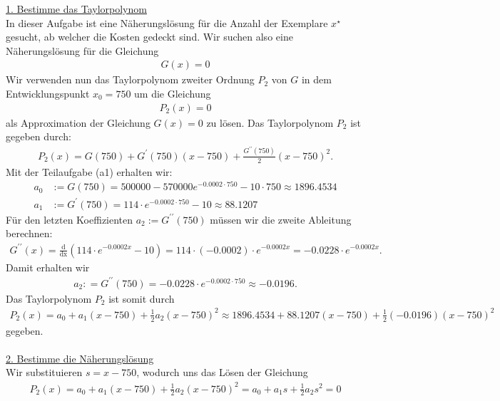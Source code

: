 \underline{1. Bestimme das Taylorpolynom}\\
In dieser Aufgabe ist eine Näherungslösung für die Anzahl der Exemplare $x^\star$ gesucht, ab welcher die Kosten gedeckt sind. Wir suchen also eine Näherungslösung für die Gleichung
\begin{align*}
	G(x) = 0
\end{align*}
Wir verwenden nun das Taylorpolynom zweiter Ordnung $P_2$ von $G$ in dem Entwicklungspunkt $x_0 = 750$ um die Gleichung
\begin{align*}
	P_2(x) = 0
\end{align*}
als Approximation der Gleichung $G(x) = 0$ zu lösen. Das Taylorpolynom $P_2$ ist gegeben durch:
\begin{align*}
	P_2(x)
	=
	G(750) 
	+ G^\prime(750) (x - 750)
	+ \frac{G^{\prime \prime}(750)}{2} (x - 750)^2.
\end{align*}
Mit der Teilaufgabe (a1)  erhalten wir:
\begin{align*}
	a_0 &:= G(750) 
	= 
	500000 - 570000 e^{-0.0002 \cdot 750 } - 10 \cdot 750
	\approx  1896.4534\\
	a_1 &:= G^\prime(750)
	=
	114 \cdot e^{-0.0002 \cdot  750}- 10
	\approx 88.1207
\end{align*}
Für den letzten Koeffizienten $a_2 := G^{\prime \prime}(750)$ müssen wir die zweite Ableitung berechnen:
\begin{align*}
	G^{\prime \prime}(x)
	=
	\frac{\mathrm{d}}{\mathrm{dx}}
	\left(
			114 \cdot e^{-0.0002 x}- 10
	\right)
	=
	114 \cdot  ( -0.0002) \cdot e^{-0.0002 x}
	=
	-0.0228 \cdot e^{-0.0002 x}.
\end{align*}
Damit erhalten wir
\begin{align*}
	a_2 : = G^{\prime \prime}(750)
	= -0.0228 \cdot e^{-0.0002 \cdot 750}
	\approx
	-0.0196.	
\end{align*}
Das Taylorpolynom $P_2$ ist somit durch 
\begin{align*}
	P_2(x)
	= 
	a_0 
	+ 
	a_1(x - 750)
	+
	\frac{1}{2}
	a_2 
	(x - 750)^2 	
	\approx
	1896.4534
	+
	88.1207
	(x - 750)
	+
	\frac{1}{2}
	(-0.0196) (x - 750)^2
\end{align*}
gegeben.\\
\\
\underline{2. Bestimme die Näherungslösung}\\
Wir substituieren $s = x - 750$, wodurch uns das Lösen der Gleichung
\begin{align*}
	P_2(x) = a_0 
	+ 
	a_1(x - 750)
	+
	\frac{1}{2}
	a_2 
	(x - 750)^2 	
	=
	a_0 + a_1 s +\frac{1}{2} a_2 s^2 = 0
\end{align*}
